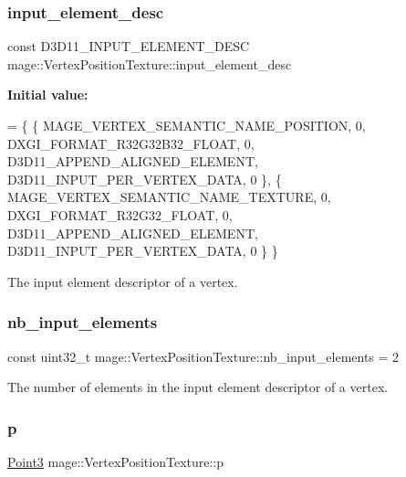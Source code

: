 \subsubsection{\texorpdfstring{input\+\_\+element\+\_\+desc}{input\_element\_desc}}
{\footnotesize\ttfamily const D3\+D11\+\_\+\+I\+N\+P\+U\+T\+\_\+\+E\+L\+E\+M\+E\+N\+T\+\_\+\+D\+E\+SC mage\+::\+Vertex\+Position\+Texture\+::input\+\_\+element\+\_\+desc\hspace{0.3cm}{\ttfamily [static]}}

{\bfseries Initial value\+:}
\begin{DoxyCode}
= \{
        \{ MAGE\_VERTEX\_SEMANTIC\_NAME\_POSITION, 0, DXGI\_FORMAT\_R32G32B32\_FLOAT,    0, 
      D3D11\_APPEND\_ALIGNED\_ELEMENT, D3D11\_INPUT\_PER\_VERTEX\_DATA, 0 \},
        \{ MAGE\_VERTEX\_SEMANTIC\_NAME\_TEXTURE,  0, DXGI\_FORMAT\_R32G32\_FLOAT,       0, 
      D3D11\_APPEND\_ALIGNED\_ELEMENT, D3D11\_INPUT\_PER\_VERTEX\_DATA, 0 \}
    \}
\end{DoxyCode}
The input element descriptor of a vertex. \hypertarget{structmage_1_1_vertex_position_texture_a1ef796b1dfad7a11d03120cb65a8cdb4}{}\label{structmage_1_1_vertex_position_texture_a1ef796b1dfad7a11d03120cb65a8cdb4} 
\subsubsection{\texorpdfstring{nb\+\_\+input\+\_\+elements}{nb\_input\_elements}}
{\footnotesize\ttfamily const uint32\+\_\+t mage\+::\+Vertex\+Position\+Texture\+::nb\+\_\+input\+\_\+elements = 2\hspace{0.3cm}{\ttfamily [static]}}

The number of elements in the input element descriptor of a vertex. \hypertarget{structmage_1_1_vertex_position_texture_a49253c4db52d1a4905838ba6ed6c52c6}{}\label{structmage_1_1_vertex_position_texture_a49253c4db52d1a4905838ba6ed6c52c6} 
\subsubsection{\texorpdfstring{p}{p}}
{\footnotesize\ttfamily \hyperlink{structmage_1_1_point3}{Point3} mage\+::\+Vertex\+Position\+Texture\+::p}

